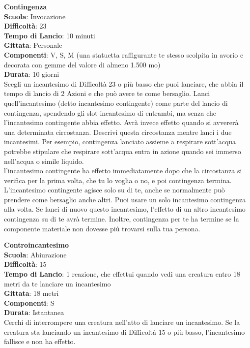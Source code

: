 \begin{multicols}{2}
\medskip\textbf{Contingenza}\\
\textbf{Scuola}: Invocazione\\
\textbf{Difficoltà}: 23\\
\textbf{Tempo di Lancio}: 10 minuti\\
\textbf{Gittata}: Personale\\
\textbf{Componenti}: V, S, M (una statuetta raffigurante te stesso scolpita in avorio e decorata con gemme del valore di almeno 1.500 mo)\\
\textbf{Durata}: 10 giorni\\
Scegli un incantesimo di Difficoltà 23 o più basso che puoi lanciare, che abbia il tempo di lancio di 2 Azioni e che può avere te come bersaglio. Lanci quell'incantesimo (detto incantesimo contingente) come parte del lancio di contingenza, spendendo gli slot incantesimo di entrambi, ma senza che l'incantesimo contingente abbia effetto. Avrà invece effetto quando si avvererà una determinata circostanza. Descrivi questa circostanza mentre lanci i due incantesimi. Per esempio, contingenza lanciato assieme a respirare sott'acqua potrebbe stipulare che respirare sott'acqua entra in azione quando sei immerso nell'acqua o simile liquido.\\
l'incantesimo contingente ha effetto immediatamente dopo che la circostanza si verifica per la prima volta, che tu lo voglia o no, e poi contingenza termina. L'incantesimo contingente agisce solo su di te, anche se normalmente può prendere come bersaglio anche altri. Puoi usare un solo incantesimo contingenza alla volta. Se lanci di nuovo questo incantesimo, l'effetto di un altro incantesimo contingenza su di te avrà termine. Inoltre, contingenza per te ha termine se la componente materiale non dovesse più trovarsi sulla tua persona.


\medskip\textbf{Controincantesimo}\\
\textbf{Scuola}: Abiurazione\\
\textbf{Difficoltà}: 15\\
\textbf{Tempo di Lancio}: 1 reazione, che effettui quando vedi una creatura entro 18 metri da te lanciare un incantesimo\\
\textbf{Gittata}: 18 metri\\
\textbf{Componenti}: S \\
\textbf{Durata}: Istantanea\\
Cerchi di interrompere una creatura nell'atto di lanciare un incantesimo. Se la creatura sta lanciando un incantesimo di Difficoltà 15 o più basso, l'incantesimo fallisce e non ha effetto. 



\end{multicols}
